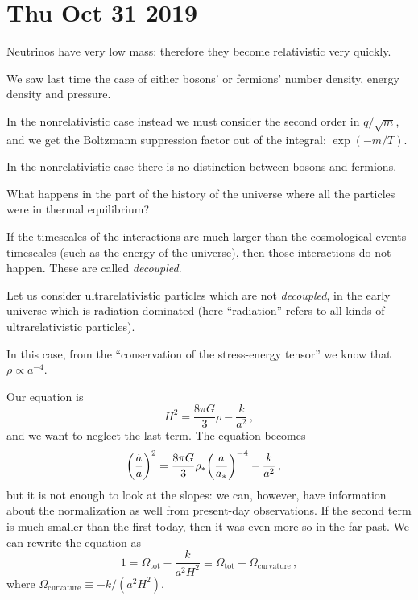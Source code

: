 \documentclass[main.tex]{subfiles}
\begin{document}
\section*{Thu Oct 31 2019}

Neutrinos have very low mass: therefore they become relativistic very quickly.

We saw last time the case of either bosons' or fermions' number density, energy density and pressure. 

In the nonrelativistic case instead we must consider the second order in \(q / \sqrt{m} \), and we get the Boltzmann suppression factor out of the integral: \(\exp(-m/T) \).

In the nonrelativistic case there is no distinction between bosons and fermions.

What happens in the part of the history of the universe where all the particles were in thermal equilibrium?

If the timescales of the interactions are much larger than the cosmological events timescales (such as the energy of the universe), then those interactions do not happen.
These are called \emph{decoupled}.

Let us consider ultrarelativistic particles which are not \emph{decoupled}, in the early universe which is radiation dominated (here ``radiation'' refers to all kinds of ultrarelativistic particles). 

In this case, from the ``conservation of the stress-energy tensor'' we know that \(\rho \propto a^{-4}\).

Our equation is 
%
\begin{equation}
  H^2= \frac{8 \pi G}{3} \rho - \frac{k}{a^2}
\,,
\end{equation}
%
and we want to neglect the last term. The equation becomes 
%
\begin{subequations}
\begin{align}
  \qty(\frac{\dot{a} }{a})^2 &= \frac{8 \pi G }{3} \rho_{*} \qty(\frac{a}{a_{*}})^{-4} - \frac{k}{a^2} 
\,,
\end{align}
\end{subequations}
%
but it is not enough to look at the slopes: we can, however, have information about the normalization as well from present-day observations.
If the second term is much smaller than the first today, then it was even more so in the far past. We can rewrite the equation as
%
\begin{equation}
  1 = \Omega_{\text{tot}} - \frac{k}{a^2 H^2} \equiv \Omega _{\text{tot}} + \Omega_{\text{curvature}}
\,,
\end{equation}
%
where \(\Omega _{\text{curvature}} \equiv -k / (a^2 H^2)\).
\end{document}

